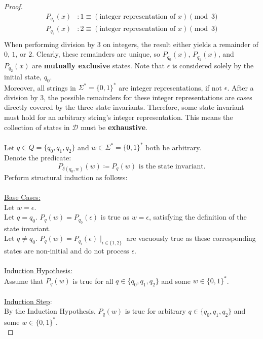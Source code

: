 \documentclass[12pt]{article}
\begin{document}
\begin{proof}
\begin{equation*}
\begin{aligned}
                P_{q_1}(x)&: 1 \equiv (\text{integer representation of } x)\pmod{3} \\
                P_{q_2}(x)&: 2 \equiv (\text{integer representation of } x)\pmod{3} \\
            \end{aligned}
    \end{equation*}
    When performing division by $3$ on integers, the result either yields a remainder of $0$, $1$, or $2$. Clearly, these remainders are unique, so $P_{q_0}(x)$, $P_{q_1}(x)$, and $P_{q_2}(x)$ are \textbf{mutually exclusive} states. Note that $\epsilon$ is considered solely by the initial state, $q_0$. \\
    Moreover, all strings in $\Sigma^* = \{0, 1\}^*$ are integer representations, if not $\epsilon$. After a division by $3$, the possible remainders for these integer representations are cases directly covered by the three state invariants. Therefore, some state invariant must hold for an arbitrary string's integer representation. This means the collection of states in $\mathcal{D}$ must be \textbf{exhaustive}. \\
    \\
    Let $q \in Q = \{q_0, q_1, q_2\}$ and $w \in \Sigma^* = \{0, 1\}^*$ both be arbitrary. \\
    Denote the predicate:
    \[
        P_{\delta(q_0, w)}(w) \coloneqq P_q(w) \text{ is the state invariant.}
    \]
    Perform structural induction as follows: \\
    \\
    \underline{Base Cases:} \\
    Let $w = \epsilon$. \\
    Let $q = q_0$. $P_q(w) = P_{q_0}(\epsilon)$ is true as $w = \epsilon$, satisfying the definition of the state invariant. \\
    Let $q \neq q_0$. $P_q(w) = P_{q_i}(\epsilon) \mid_{i \in \{1, 2\}}$ are vacuously true as these corresponding states are non-initial and do not process $\epsilon$. \\
    \\
    \underline{Induction Hypothesis:} \\
    Assume that $P_q(w)$ is true for all $q \in \{q_0, q_1, q_2\}$ and some $w \in \{0, 1\}^*$. \\
    \\
    \underline{Induction Step}: \\
    By the Induction Hypothesis, $P_q(w)$ is true for arbitrary $q \in \{q_0, q_1, q_2\}$ and some $w \in \{0, 1\}^*$. \\

\end{proof}
\end{document}
